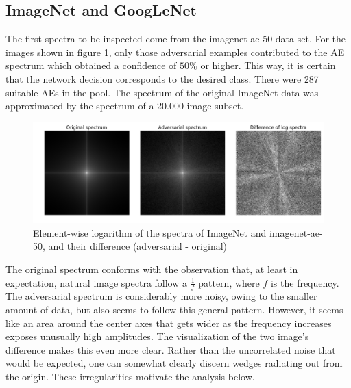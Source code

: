 \documentclass[11pt, a4paper]{article}
\begin{document}
\subsection{ImageNet and GoogLeNet}
The first spectra to be inspected come from the imagenet-ae-50 data set. For the images shown in figure \ref{fig:imagenet-ae-50-spectra}, only those adversarial examples contributed to the AE spectrum which obtained a confidence of $50\%$ or higher. This way, it is certain that the network decision corresponds to the desired class. There were 287 suitable AEs in the pool. The spectrum of the original ImageNet data was approximated by the spectrum of a 20.000 image subset.

\begin{figure}[h!tb]
	\centering
	\includegraphics[width=\textwidth]{images/spectra/imagenet-ae-50-minconfidence-0dot5-maxorig-20000-spectra.png}
	\caption[Log spectra of ImageNet and adversarial examples]{Element-wise logarithm of the spectra of ImageNet and imagenet-ae-50, and their difference (adversarial - original)}
	\label{fig:imagenet-ae-50-spectra}
\end{figure}

The original spectrum conforms with the observation that, at least in expectation, natural image spectra follow a $\frac{1}{f}$ pattern, where $f$ is the frequency\cite{relations-between-natural-image-statistics-and-cortical-cells}. The adversarial spectrum is considerably more noisy, owing to the smaller amount of data, but also seems to follow this general pattern. However, it seems like an area around the center axes that gets wider as the frequency increases exposes unusually high amplitudes. The visualization of the two image's difference makes this even more clear. Rather than the uncorrelated noise that would be expected, one can somewhat clearly discern wedges radiating out from the origin. These irregularities motivate the analysis below.
\end{document}

